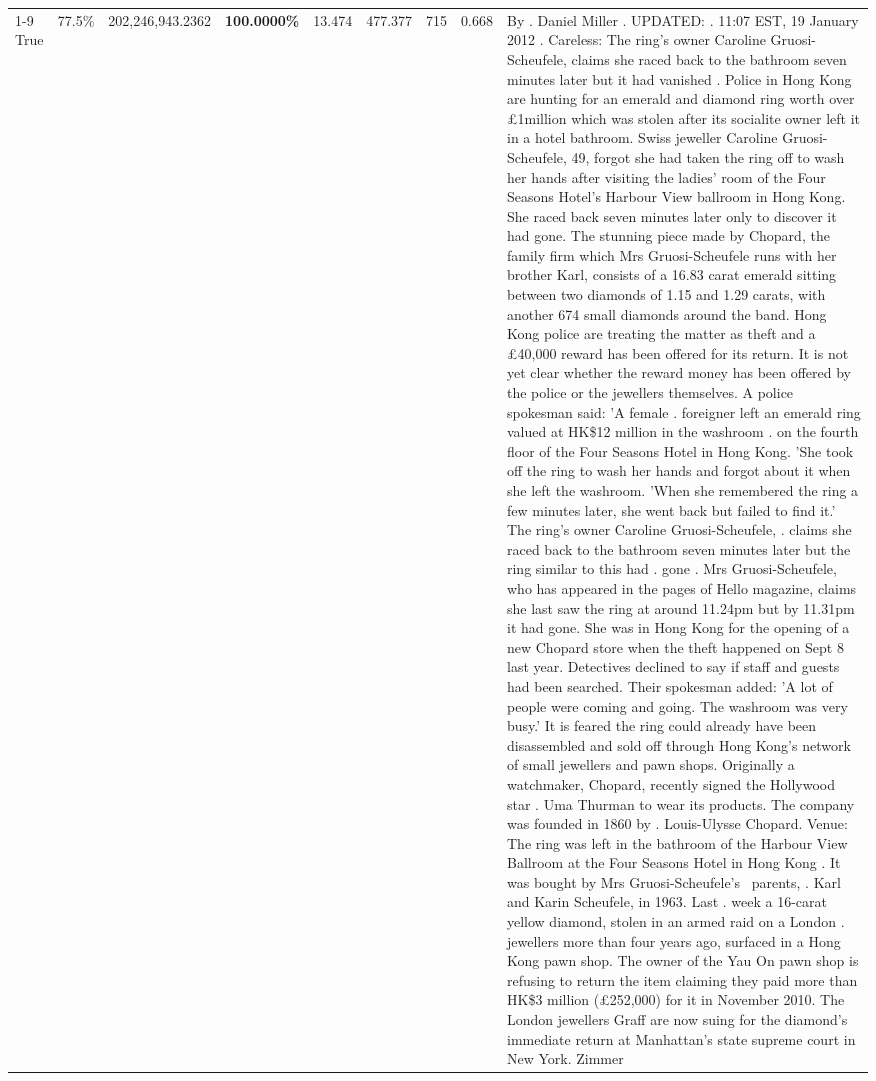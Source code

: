 \begin{table}[H]
\begin{tabular}{lllrlllll}
\cline{1-9}
True & 77.5\% & 202,246,943.2362 & \bfseries \color{red} 100.0000\% & 13.474 & 477.377 & 715 & 0.668 & By . Daniel Miller . UPDATED: . 11:07 EST, 19 January 2012 . Careless: The ring's owner Caroline Gruosi-Scheufele, claims she raced back to the bathroom seven minutes later but it had vanished . Police in Hong Kong are hunting for an emerald and diamond ring worth over £1million which was stolen after its socialite owner left it in a hotel bathroom. Swiss jeweller Caroline Gruosi-Scheufele, 49, forgot she had taken the ring off to wash her hands after visiting the ladies' room of the Four Seasons Hotel's Harbour View ballroom in Hong Kong. She raced back seven minutes later only to discover it had gone. The stunning piece made by Chopard, the family firm which Mrs Gruosi-Scheufele runs with her brother Karl, consists of a 16.83 carat emerald sitting between two diamonds of 1.15 and 1.29 carats, with another 674 small diamonds around the band. Hong Kong police are treating the matter as theft and a £40,000 reward has been offered for its return. It is not yet clear whether the reward money has been offered by the police or the jewellers themselves. A police spokesman said: 'A female . foreigner left an emerald ring valued at HK\$12 million in the washroom . on the fourth floor of the Four Seasons Hotel in Hong Kong. 'She took off the ring to wash her hands and forgot about it when she left the washroom. 'When she remembered the ring a few minutes later, she went back but failed to find it.' The ring's owner Caroline Gruosi-Scheufele, . claims she raced back to the bathroom seven minutes later but the ring similar to this had . gone . Mrs Gruosi-Scheufele, who has appeared in the pages of Hello magazine, claims she last saw the ring at around 11.24pm but by 11.31pm it had gone. She was in Hong Kong for the opening of a new Chopard store when the theft happened on Sept 8 last year. Detectives declined to say if staff and guests had been searched. Their spokesman added: 'A lot of people were coming and going. The washroom was very busy.' It is feared the ring could already have been disassembled and sold off through Hong Kong's network of small jewellers and pawn shops. Originally a watchmaker, Chopard, recently signed the Hollywood star . Uma Thurman to wear its products. The company was founded in 1860 by . Louis-Ulysse Chopard. Venue: The ring was left in the bathroom of the Harbour View Ballroom at the Four Seasons Hotel in Hong Kong . It was bought by Mrs Gruosi-Scheufele's  parents, . Karl and Karin Scheufele, in 1963. Last . week a 16-carat yellow diamond, stolen in an armed raid on a London . jewellers more than four years ago, surfaced in a Hong Kong pawn shop. The owner of the Yau On pawn shop is refusing to return the item claiming they paid more than HK\$3 million (£252,000) for it in November 2010. The London jewellers Graff are now suing for the diamond’s immediate return at Manhattan’s state supreme court in New York. Zimmer \\

\end{tabular}
\end{table}
